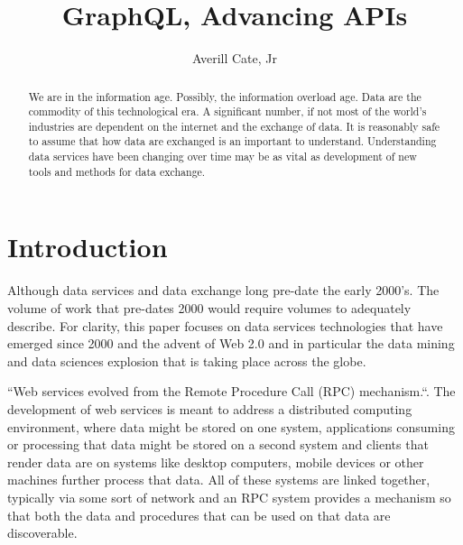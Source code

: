 
\title{GraphQL, Advancing APIs}

\author{Averill Cate, Jr}

\renewcommand{\shortauthors}{A. Cate, Jr}

\begin{abstract}
We are in the information age.  Possibly, the information overload age.
Data are the commodity of this technological era.  A significant number, if not
most of the world's industries are dependent on the internet and the exchange
of data.  It is reasonably safe to assume that how data are exchanged is
an important to understand.  Understanding data services have been changing
over time may be as vital as development of new tools and methods for data
exchange.
\end{abstract}


\maketitle

\section{Introduction}
Although data services and data exchange long pre-date the early 2000's.  The
volume of work that pre-dates 2000 would require volumes to adequately describe.
For clarity, this paper focuses on data services technologies that have emerged
since 2000 and the advent of Web 2.0 and in particular the data mining and
data sciences explosion that is taking place across the globe.

``Web services evolved from the Remote Procedure Call (RPC) mechanism.``\cite{hid505Kalin2009}.  
The development of web services is meant to address a distributed computing 
environment, where data might be stored on one system, applications consuming 
or processing that data might be stored on a second system and clients that 
render data are on systems like desktop computers, mobile devices or other 
machines further process that data.  All of these systems are linked together, 
typically via some sort of network and an RPC system provides a mechanism so 
that both the data and procedures that can be used on that data are 
discoverable\cite{hid505Kalin2009}.


